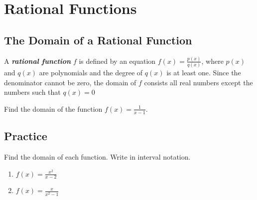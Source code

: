 
\hypertarget{rational-functions}{%
\section{Rational Functions}\label{rational-functions}}

\hypertarget{the-domain-of-a-rational-function}{%
\subsection{The Domain of a Rational
Function}\label{the-domain-of-a-rational-function}}

A \textbf{\emph{rational function}} \(f\) is defined by an equation
\(f(x)=\frac{p(x)}{q(x)}\), where \(p(x)\) and \(q(x)\) are polynomials
and the degree of \(q(x)\) is at least one. Since the denominator cannot be zero, the domain of \(f\) consists all real numbers except the
numbers such that \(q(x)=0\)

\begin{example}

Find the domain of the function \(f(x)=\frac{1}{x-1}\).

\end{example}
\vspace*{6\baselineskip}

\subsection{Practice}

\begin{exercise}

Find the domain of each function. Write in interval notation.

\begin{enumerate}
\item
  \(f(x)=\frac{x^2}{x-2}\)
\item
  \(f(x)=\frac{x}{x^2-1}\)\hfill\null
\end{enumerate}

\end{exercise}

